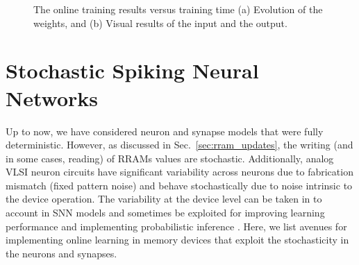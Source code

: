 \documentclass[english]{article}
\newcommand{\refsec}[1]{{Sec.~\ref{#1}}}
\renewcommand{\cite}{\citep}
\begin{document}
\begin{figure}[!t]
\centering
\vspace{-0.2in}
\hfil
\vspace{-0.01in}
\vspace{-0.05in}
\caption{The online training results versus training time (a) Evolution of the weights, and (b) Visual results of the input and the output.}
\label{FigResults}
\end{figure}

\section{Stochastic Spiking Neural Networks}
Up to now, we have considered neuron and synapse models that were fully deterministic. However, as discussed in \refsec{sec:rram_updates}, the writing (and in some cases, reading) of RRAMs values are stochastic. 
Additionally, analog VLSI neuron circuits have significant variability across neurons due to fabrication mismatch (fixed pattern noise) and behave stochastically due to noise intrinsic to the device operation.
The variability at the device level can be taken in to account in \ac{SNN} models and sometimes be exploited for improving learning performance and implementing probabilistic inference \cite{Querlioz_etal15_bioiprog,Naous_etal16_memrneura}. Here, we list avenues for implementing online learning in memory devices that exploit the stochasticity in the neurons and synapses.
\end{document}
